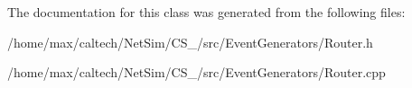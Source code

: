 \-The documentation for this class was generated from the following files\-:\begin{DoxyCompactItemize}
\item 
/home/max/caltech/\-Net\-Sim/\-C\-S\-\_/src/\-Event\-Generators/\-Router.\-h\item 
/home/max/caltech/\-Net\-Sim/\-C\-S\-\_/src/\-Event\-Generators/\-Router.\-cpp\end{DoxyCompactItemize}
